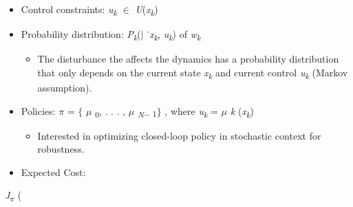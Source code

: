 \documentclass[12pt,twoside]{article}
\begin{document}
\begin{itemize}
\begin{itemize}
\begin{itemize}
\end{itemize}
	\item {\fontsize{10pt}{12.0pt}\selectfont Control constraints: \textit{u\textsubscript{k} }$ \in $  \textit{U}(\textit{x\textsubscript{k}})\par}\par

	\item {\fontsize{10pt}{12.0pt}\selectfont Probability distribution:  \textit{P\textsubscript{k}}($ \vert $ ˙\textit{x\textsubscript{k}}, \textit{u\textsubscript{k}}) of \textit{w\textsubscript{k}}\par}\par

\begin{itemize}
	\item {\fontsize{10pt}{12.0pt}\selectfont The disturbance the affects the dynamics has a probability distribution that only depends on the current state \textit{x\textsubscript{k} }and current control \textit{u\textsubscript{k} }(Markov assumption).\par}\par


\end{itemize}
	\item {\fontsize{10pt}{12.0pt}\selectfont Policies: \textit{$ \pi $  }= $ \{ $ \textit{$ \mu $ }\textsubscript{0}, . . . , \textit{$ \mu $ \textsubscript{N}}\textsubscript{$-$ 1}$ \} $ , where \textit{u\textsubscript{k} }= \textit{$ \mu $ k }(\textit{x\textsubscript{k}})\par}\par

\begin{itemize}
	\item {\fontsize{10pt}{12.0pt}\selectfont Interested in optimizing closed-loop policy in stochastic context for robustness.\par}\par


\end{itemize}
	\item {\fontsize{10pt}{12.0pt}\selectfont Expected Cost:\par}\par


\vspace{\baselineskip}

\end{itemize}
\end{itemize}\begin{FlushRight}
{\fontsize{10pt}{12.0pt}\selectfont \textit{J\textsubscript{$ \pi $ } }(\par}
\end{FlushRight}\par
\end{document}
